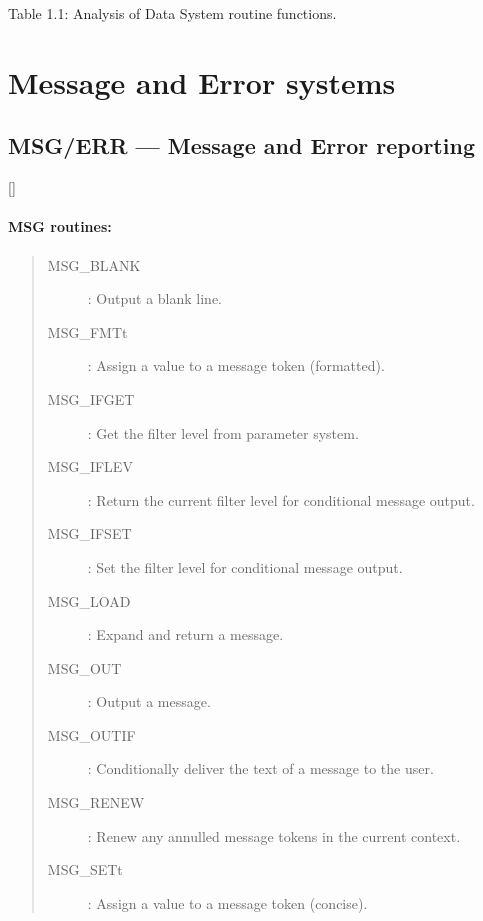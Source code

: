 \begin{center}
Table 1.1: Analysis of Data System routine functions.
\end{center}

\newpage

\section{Message and Error systems}
\label{R_ME}

\subsection{MSG/ERR --- Message and Error reporting} 

\vspace{-9mm}

\hfill []

\vspace{2mm}

\paragraph{MSG routines:}

\begin{quote}
\begin{description}
\item [MSG\_BLANK] : Output a blank line.
\item [MSG\_FMTt] : Assign a value to a message token (formatted).
\item [MSG\_IFGET] : Get the filter level from parameter system.
\item [MSG\_IFLEV] : Return the current filter level for conditional message output.
\item [MSG\_IFSET] : Set the filter level for conditional message output.
\item [MSG\_LOAD] : Expand and return a message. 
\item [MSG\_OUT] : Output a message.
\item [MSG\_OUTIF] : Conditionally deliver the text of a message to the user.
\item [MSG\_RENEW] : Renew any annulled message tokens in the current context.
\item [MSG\_SETt] : Assign a value to a message token (concise).
\end{description}
\end{quote}

\vspace*{10mm}

